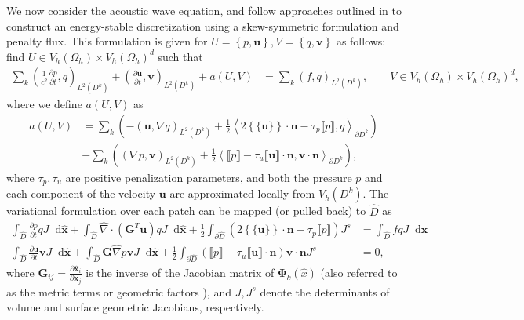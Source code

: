 \documentclass[preprint,10pt]{elsarticle}
\newcommand{\pd}[2]{\frac{\partial#1}{\partial#2}}
\newcommand{\LRp}[1]{\left( #1 \right)}
\newcommand{\LRa}[1]{\left\langle #1 \right\rangle}
\newcommand{\LRc}[1]{\left\{ #1 \right\}}
\newcommand{\Grad} {\ensuremath{\nabla}}
\newcommand{\jump}[1] {\ensuremath{\llbracket#1\rrbracket}}
\newcommand{\avg}[1] {\ensuremath{\LRc{\!\{#1\}\!}}}
\newcommand{\Dhat}{\widehat{D}}
\newcommand{\reviewerTwo}[1]{#1}
\newcommand*\diff[1]{\mathop{}\!{\mathrm{d}#1}}
\begin{document}
We now consider the acoustic wave equation, and follow approaches outlined in \cite{chan2016weight1, chan2016weight2} to construct an energy-stable discretization using a skew-symmetric formulation and penalty flux.  This formulation is given for $U = \LRc{p,\bm{u}}, V = \LRc{q,\bm{v}}$ as follows: \reviewerTwo{find $U \in V_h(\Omega_h) \times V_h(\Omega_h)^d$ such that}
\begin{align}
\sum_k\LRp{\frac{1}{c^2}\pd{p}{t},q}_{L^2\LRp{D^k}} + \LRp{\pd{\bm{u}}{t},\bm{v}}_{L^2\LRp{D^k}} + a(U,V) &= \sum_k\LRp{f,q}_{L^2\LRp{D^k}}, \qquad \reviewerTwo{V \in V_h(\Omega_h) \times V_h(\Omega_h)^d,} \label{eq:varformwave1}
\end{align}
where we define $a(U,V)$ as
\begin{align*}
a(U,V) &= \sum_k\LRp{-\LRp{\bm{u},\Grad q}_{L^2\LRp{D^k}} + \frac{1}{2}\LRa{2\avg{\bm{u}}\cdot\bm{n} - \tau_p \jump{p},q}_{\partial D^k}} \\
 &+ \sum_k\LRp{\LRp{\Grad p,\bm{v}}_{L^2\LRp{D^k}} + \frac{1}{2}\LRa{\jump{p} - \tau_u \jump{\bm{u}}\cdot\bm{n},\bm{v}\cdot\bm{n}}_{\partial D^k}},
\end{align*}
where $\tau_p, \tau_u$ are positive penalization parameters, and both the pressure $p$ and each component of the velocity $\bm{u}$ are approximated locally from $V_h\LRp{D^k}$.  The variational formulation over each patch can be mapped \reviewerTwo{(or pulled back)} to $\Dhat$ as
\begin{align*}
\int_{\Dhat} \pd{p}{t} q J\diff{\bm{\widehat{x}}} + \int_{\Dhat} \widehat{\Grad}\cdot \LRp{\bm{G}^T\bm{u}}qJ\diff{\bm{\widehat{x}}} + \frac{1}{2}\int_{\partial \widehat{D}}\LRp{2\avg{\bm{u}}\cdot\bm{n} - \tau_p \jump{p}}J^s &= \int_{\Dhat} f q J\diff{\bm{\widehat{x}}}\\
\int_{\Dhat} \pd{\bm{u}}{t} \bm{v} J\diff{\bm{\widehat{x}}} + \int_{\Dhat} \bm{G}\widehat{\Grad} {p}\bm{v}J\diff{\bm{\widehat{x}}} + \frac{1}{2}\int_{\partial \widehat{D}}\LRp{\jump{p} - \tau_u \jump{\bm{u}}\cdot\bm{n}}\bm{v}\cdot\bm{n} J^s &=0, 
\end{align*}
where $\bm{G}_{ij} = \pd{\widehat{\bm{x}}_i}{\bm{x}_j}$ \reviewerTwo{is the inverse of the Jacobian matrix of $\bm{\Phi}_k(\hat{x})$ (also referred to as the metric terms \cite{kopriva2006metric} or geometric factors \cite{hesthaven2007nodal})}, and $J, J^s$ denote the determinants of volume and surface geometric Jacobians, respectively.  
\end{document}
